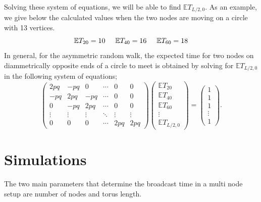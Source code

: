 \documentclass[a4paper,10pt,english]{article}
\begin{document}
Solving these system of equations, we will be able to find $\mathbb{E}T_{L/2,0}$. As an example, we give below the calculated values when the two nodes are moving on a circle with 13 vertices.
\begin{equation*}
\mathbb{E}T_{20}=10 \hspace{.5cm} \mathbb{E}T_{40}=16 \hspace{.5cm} \mathbb{E}T_{60}=18
\end{equation*}
In general, for the asymmetric random walk, the expected time for two nodes on diammetrically opposite ends of a circle to meet is obtained by solving for $\mathbb{E}T_{L/2,0}$ in the following system of equations;
\begin{equation}
\begin{pmatrix}
2pq & -pq & 0 & \cdots & 0 & 0\\
-pq & 2pq & -pq & \cdots & 0  & 0\\
0 &-pq & 2pq & \cdots & 0 & 0\\
\vdots  & \vdots & \vdots & \ddots & \vdots & \vdots \\
0 & 0 & 0 & \cdots & 2pq & 2pq 
\end{pmatrix}
\begin{pmatrix}
\mathbb{E}T_{20}\\
\mathbb{E}T_{40}\\
\mathbb{E}T_{60}\\
\vdots\\
\mathbb{E}T_{L/2,0}
\end{pmatrix}
=
\begin{pmatrix}
1\\
1\\
1\\
\vdots\\
1
\end{pmatrix}.
\end{equation}

\section{Simulations}\label{sim}
The two main parameters that determine the broadcast time in a multi node setup are number of nodes and torus length.
\end{document}

